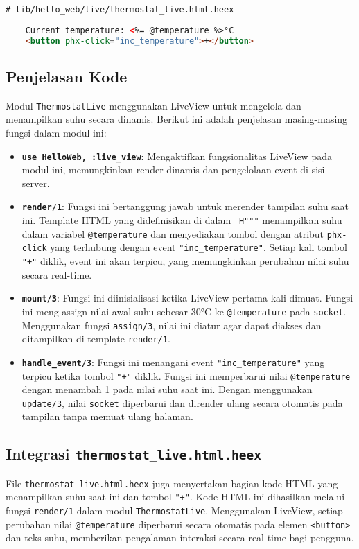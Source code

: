 \begin{lstlisting}[language=HTML]
	# lib/hello_web/live/thermostat_live.html.heex
	
	Current temperature: <%= @temperature %>°C
	<button phx-click="inc_temperature">+</button>
\end{lstlisting}

\subsection{Penjelasan Kode}
Modul \texttt{ThermostatLive} menggunakan LiveView untuk mengelola dan menampilkan suhu secara dinamis. Berikut ini adalah penjelasan masing-masing fungsi dalam modul ini:

\begin{itemize}
	\item \textbf{\texttt{use HelloWeb, :live\_view}}: Mengaktifkan fungsionalitas LiveView pada modul ini, memungkinkan render dinamis dan pengelolaan event di sisi server.
	
	\item \textbf{\texttt{render/1}}: Fungsi ini bertanggung jawab untuk merender tampilan suhu saat ini. Template HTML yang didefinisikan di dalam \texttt{~H"""} menampilkan suhu dalam variabel \texttt{@temperature} dan menyediakan tombol dengan atribut \texttt{phx-click} yang terhubung dengan event \texttt{"inc\_temperature"}. Setiap kali tombol \texttt{"+"} diklik, event ini akan terpicu, yang memungkinkan perubahan nilai suhu secara real-time.
	
	\item \textbf{\texttt{mount/3}}: Fungsi ini diinisialisasi ketika LiveView pertama kali dimuat. Fungsi ini meng-assign nilai awal suhu sebesar 30°C ke \texttt{@temperature} pada \texttt{socket}. Menggunakan fungsi \texttt{assign/3}, nilai ini diatur agar dapat diakses dan ditampilkan di template \texttt{render/1}.
	
	\item \textbf{\texttt{handle\_event/3}}: Fungsi ini menangani event \texttt{"inc\_temperature"} yang terpicu ketika tombol \texttt{"+"} diklik. Fungsi ini memperbarui nilai \texttt{@temperature} dengan menambah 1 pada nilai suhu saat ini. Dengan menggunakan \texttt{update/3}, nilai \texttt{socket} diperbarui dan dirender ulang secara otomatis pada tampilan tanpa memuat ulang halaman.
\end{itemize}

\subsection{Integrasi \texttt{thermostat\_live.html.heex}}
File \texttt{thermostat\_live.html.heex} juga menyertakan bagian kode HTML yang menampilkan suhu saat ini dan tombol \texttt{"+"}. Kode HTML ini dihasilkan melalui fungsi \texttt{render/1} dalam modul \texttt{ThermostatLive}. Menggunakan LiveView, setiap perubahan nilai \texttt{@temperature} diperbarui secara otomatis pada elemen \texttt{<button>} dan teks suhu, memberikan pengalaman interaksi secara real-time bagi pengguna.

